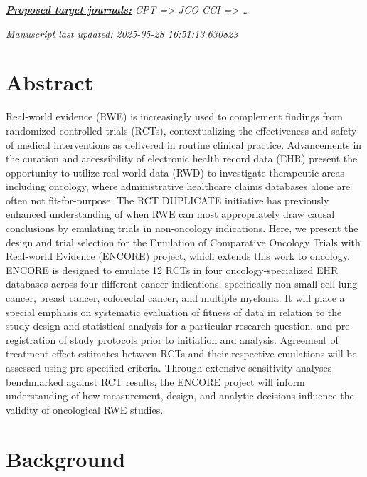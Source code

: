 \documentclass[
  letterpaper,
  DIV=11,
  numbers=noendperiod]{scrartcl}
\begin{document}
\ul{\textbf{\emph{Proposed target journals:}}} \emph{CPT =\textgreater{}
JCO CCI =\textgreater{} \ldots{}}

\emph{Manuscript last updated: 2025-05-28 16:51:13.630823}

\newpage{}

\section*{Abstract}\label{abstract}

Real-world evidence (RWE) is increasingly used to complement findings
from randomized controlled trials (RCTs), contextualizing the
effectiveness and safety of medical interventions as delivered in
routine clinical practice. Advancements in the curation and
accessibility of electronic health record data (EHR) present the
opportunity to utilize real-world data (RWD) to investigate therapeutic
areas including oncology, where administrative healthcare claims
databases alone are often not fit-for-purpose. The RCT DUPLICATE
initiative has previously enhanced understanding of when RWE can most
appropriately draw causal conclusions by emulating trials in
non-oncology indications. Here, we present the design and trial
selection for the Emulation of Comparative Oncology Trials with
Real-world Evidence (ENCORE) project, which extends this work to
oncology. ENCORE is designed to emulate 12 RCTs in four
oncology-specialized EHR databases across four different cancer
indications, specifically non-small cell lung cancer, breast cancer,
colorectal cancer, and multiple myeloma. It will place a special
emphasis on systematic evaluation of fitness of data in relation to the
study design and statistical analysis for a particular research
question, and pre-registration of study protocols prior to initiation
and analysis. Agreement of treatment effect estimates between RCTs and
their respective emulations will be assessed using pre-specified
criteria. Through extensive sensitivity analyses benchmarked against RCT
results, the ENCORE project will inform understanding of how
measurement, design, and analytic decisions influence the validity of
oncological RWE studies.

\newpage{}

\section{Background}\label{background}
\end{document}
